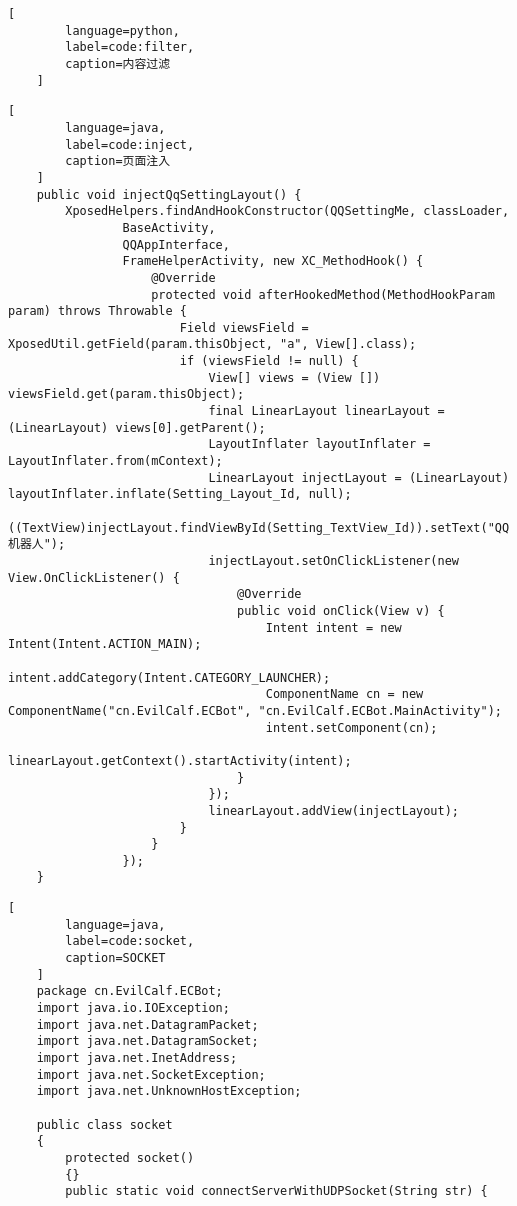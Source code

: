 \begin{appendices}
\begin{lstlisting}[
        language=python,
        label=code:filter,
        caption=内容过滤
    ]
    \end{lstlisting}
    \begin{lstlisting}[
        language=java,
        label=code:inject,
        caption=页面注入
    ]
    public void injectQqSettingLayout() {
        XposedHelpers.findAndHookConstructor(QQSettingMe, classLoader,
                BaseActivity,
                QQAppInterface,
                FrameHelperActivity, new XC_MethodHook() {
                    @Override
                    protected void afterHookedMethod(MethodHookParam param) throws Throwable {
                        Field viewsField = XposedUtil.getField(param.thisObject, "a", View[].class);
                        if (viewsField != null) {
                            View[] views = (View []) viewsField.get(param.thisObject);
                            final LinearLayout linearLayout = (LinearLayout) views[0].getParent();
                            LayoutInflater layoutInflater = LayoutInflater.from(mContext);
                            LinearLayout injectLayout = (LinearLayout) layoutInflater.inflate(Setting_Layout_Id, null);
                            ((TextView)injectLayout.findViewById(Setting_TextView_Id)).setText("QQ机器人");
                            injectLayout.setOnClickListener(new View.OnClickListener() {
                                @Override
                                public void onClick(View v) {
                                    Intent intent = new Intent(Intent.ACTION_MAIN);
                                    intent.addCategory(Intent.CATEGORY_LAUNCHER);
                                    ComponentName cn = new ComponentName("cn.EvilCalf.ECBot", "cn.EvilCalf.ECBot.MainActivity");
                                    intent.setComponent(cn);
                                    linearLayout.getContext().startActivity(intent);
                                }
                            });
                            linearLayout.addView(injectLayout);
                        }
                    }
                });
    }
    \end{lstlisting}
    \begin{lstlisting}[
        language=java,
        label=code:socket,
        caption=SOCKET
    ]
    package cn.EvilCalf.ECBot;
    import java.io.IOException;
    import java.net.DatagramPacket;
    import java.net.DatagramSocket;
    import java.net.InetAddress;
    import java.net.SocketException;
    import java.net.UnknownHostException;
    
    public class socket
    {
        protected socket()
        {}
        public static void connectServerWithUDPSocket(String str) {
    

\end{lstlisting}
\end{appendices}
